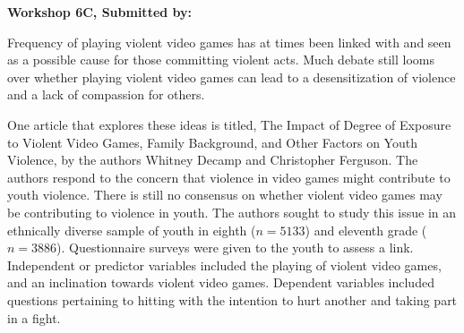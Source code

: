 \documentclass[11pt]{book}\usepackage[]{graphicx}\usepackage[]{color}
\begin{document}
\begin{exercises}
\begin{solution}
\end{solution}

\clearpage

    \begin{exercise}  %

    \begin{center}
\begin{flushleft}\textbf{\large \hfill Workshop 6C, Submitted by: }\end{flushleft}

\end{center}

Frequency of playing violent video games has at times been linked with and seen as a possible cause for those committing violent acts.  Much debate still looms over whether playing violent video games can lead to a desensitization of violence and a lack of compassion for others.

One article that explores these ideas is titled, The Impact of Degree of Exposure to Violent Video Games, Family Background, and Other Factors on Youth Violence, by the authors Whitney Decamp and Christopher Ferguson.  The authors respond to the concern that violence in video games might contribute to youth violence.  There is still no consensus on whether violent video games may be contributing to violence in youth.  The authors sought to study this issue in an ethnically diverse sample of youth in eighth ($n = 5133$) and eleventh grade ($n = 3886$).  Questionnaire surveys were given to the youth to assess a link.  Independent or predictor variables included the playing of violent video games, and an inclination towards violent video games.  Dependent variables included questions pertaining to hitting with the intention to hurt another and taking part in a fight.


\end{exercise}
\end{exercises}
\end{document}
